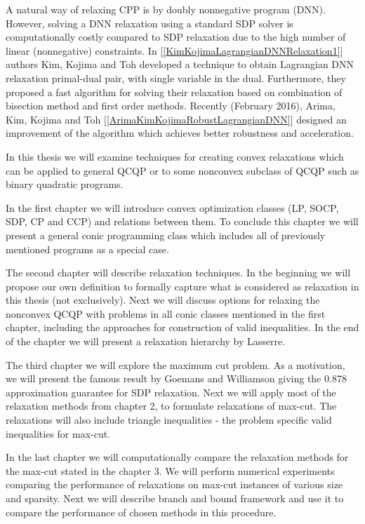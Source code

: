 \documentclass[12pt]{book}
\theoremstyle{definition}
\begin{document}
A natural way of relaxing CPP is by doubly nonnegative program (DNN).
However, solving a DNN relaxation using a standard SDP solver is computationally costly compared to SDP relaxation due to the high number of linear (nonnegative) constraints. In [\ref{KimKojimaLagrangianDNNRelaxation1}] authors Kim, Kojima and Toh developed a technique to obtain Lagrangian DNN relaxation primal-dual pair, with single variable in the dual. Furthermore, they proposed a fast algorithm for solving their relaxation based on combination of bisection method and first order methods. Recently (February 2016), Arima, Kim, Kojima and Toh [\ref{ArimaKimKojimaRobustLagrangianDNN}] designed an improvement of the algorithm which achieves better robustness and acceleration. %

\bigskip
In this thesis we will examine techniques for creating convex relaxations which can be applied to general QCQP or to some nonconvex subclass of QCQP such as binary quadratic programs. 

In the first chapter we will introduce convex optimization classes (LP, SOCP, SDP, CP and CCP) and relations between them. To conclude this chapter we will present a general conic programming class which includes all of previously mentioned programs as a special case. 

The second chapter will describe relaxation techniques. In the beginning we will propose our own definition to formally capture what is considered as relaxation in this thesis (not exclusively). Next we will discuss options for relaxing the nonconvex QCQP with problems in all conic classes mentioned in the first chapter, including the approaches for construction of valid inequalities. In the end of the chapter we will present a relaxation hierarchy by Lasserre.

The third chapter we will explore the maximum cut problem. As a motivation, we will present the famous result by Goemans and Williamson giving the 0.878 approximation guarantee for SDP relaxation. Next we will apply most of the relaxation methods from chapter 2, to formulate relaxations of max-cut. The relaxations will also include triangle inequalities - the problem specific valid inequalities for max-cut.

In the last chapter we will computationally compare the relaxation methods for the max-cut stated in the chapter 3.  We will perform numerical experiments comparing the performance of relaxations on max-cut instances of various size and sparsity. Next we will describe branch and bound framework and use it to compare the performance of chosen methods in this procedure.
\end{document}
